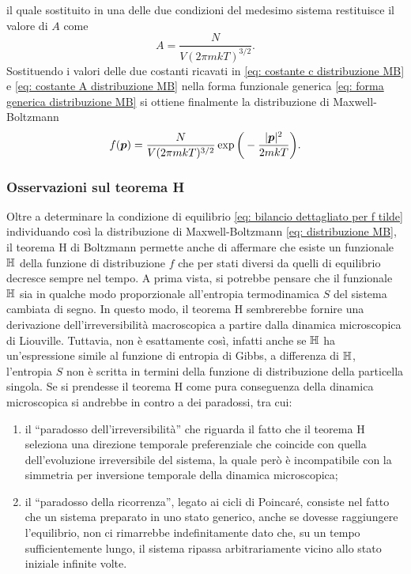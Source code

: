 il quale sostituito in una delle due condizioni del medesimo sistema restituisce il valore di $A$ come
\begin{equation}
\label{eq: costante A distribuzione MB}
    A = \frac{N}{V(2\pi mkT)^{3/2}}.
\end{equation}
Sostituendo i valori delle due costanti ricavati in \eqref{eq: costante c distribuzione MB} e \eqref{eq: costante A distribuzione MB} nella forma funzionale generica \eqref{eq: forma generica distribuzione MB} si ottiene finalmente la distribuzione di Maxwell-Boltzmann
\begin{equation}
\label{eq: distribuzione MB}
    f(\bm{p}) = \frac{N}{V(2\pi mkT)^{3/2}}\exp{\bigg(-\frac{|\bm{p}|^2}{2mkT}\bigg)}.
\end{equation}

\subsubsection{Osservazioni sul teorema H}
Oltre a determinare la condizione di equilibrio \eqref{eq: bilancio dettagliato per f tilde} individuando così la distribuzione di Maxwell-Boltzmann \eqref{eq: distribuzione MB}, il teorema H di Boltzmann permette anche di affermare che esiste un funzionale $\mathbb{H}$ della funzione di distribuzione $f$ che per stati diversi da quelli di equilibrio decresce sempre nel tempo. A prima vista, si potrebbe pensare che il funzionale $\mathbb{H}$ sia in qualche modo proporzionale all'entropia termodinamica $S$ del sistema cambiata di segno. In questo modo, il teorema H sembrerebbe fornire una derivazione dell'irreversibilità macroscopica a partire dalla dinamica microscopica di Liouville. Tuttavia, non è esattamente così, infatti anche se $\mathbb{H}$ ha un'espressione simile al funzione di entropia di Gibbs, a differenza di $\mathbb{H}$, l'entropia $S$ non è scritta in termini della funzione di distribuzione della particella singola. Se si prendesse il teorema H come pura conseguenza della dinamica microscopica si andrebbe in contro a dei paradossi, tra cui:
\begin{enumerate}
    \item il ``paradosso dell'irreversibilità'' che riguarda il fatto che il teorema H seleziona una direzione temporale preferenziale che coincide con quella dell'evoluzione irreversibile del sistema, la quale però è incompatibile con la simmetria per inversione temporale della dinamica microscopica;
    \item il ``paradosso della ricorrenza'', legato ai cicli di Poincaré, consiste nel fatto che un sistema preparato in uno stato generico, anche se dovesse raggiungere l'equilibrio, non ci rimarrebbe indefinitamente dato che, su un tempo sufficientemente lungo, il sistema ripassa arbitrariamente vicino allo stato iniziale infinite volte. 
\end{enumerate}
